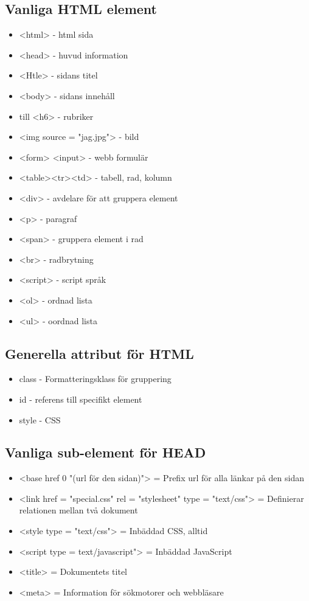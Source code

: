 \documentclass[12pt,a4paper]{article}
\begin{document}
\subsection{Vanliga HTML element}
\begin{itemize}
    \item <html> - html sida
    \item <head> - huvud information
    \item <Htle> - sidans titel
    \item <body> - sidans innehåll
    \item <h1> till <h6> - rubriker
    \item <img source = "jag.jpg"> - bild
    \item <form> <input> - webb formulär
    \item <table><tr><td> - tabell, rad, kolumn
    \item <div> - avdelare för att gruppera element
    \item <p> - paragraf
    \item <span> - gruppera element i rad
    \item <br> - radbrytning
    \item <script> - script språk
    \item <ol> - ordnad lista
    \item <ul> - oordnad lista
\end{itemize}

\subsection{Generella attribut för HTML}
\begin{itemize}
    \item class - Formatteringsklass för gruppering 
    \item id - referens till specifikt element
    \item style - CSS
\end{itemize}

\subsection{Vanliga sub-element för HEAD}
\begin{itemize}
    \item <base href 0 "(url för den sidan)"> = Prefix url för alla länkar på den sidan
    \item <link href = "special.css" rel = "stylesheet" type = "text/css"> = Definierar relationen mellan två dokument 
    \item <style type = "text/css"> = Inbäddad CSS, alltid
    \item <script type = text/javascript"> = Inbäddad JavaScript
    \item <title> = Dokumentets titel
    \item <meta> = Information för sökmotorer och webbläsare
\end{itemize}
\end{document}
